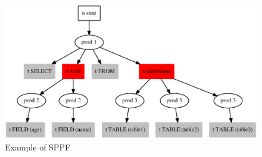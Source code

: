 \documentclass{acm_proc_article-sp}
\begin{document}
\begin{figure}[h!]
    \begin{center}
        \includegraphics[scale=0.35]{graphs/SQL_sppf_static.eps}
    \end{center}
    \caption{Example of SPPF}
    \label{sppf_sql}
\end{figure}
\end{document}

